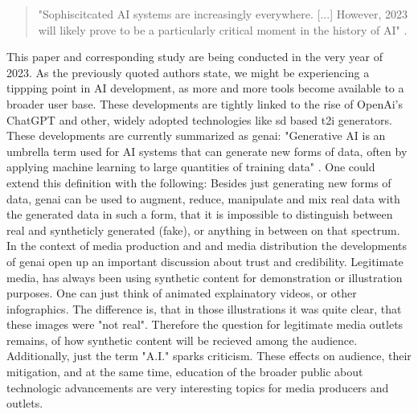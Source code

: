 \documentclass[
  a4paper,  %
  twoside,  %
  bibliography=totoc,
  headsepline,
  cleardoublepage=empty,
  parskip=half,
  draft=false
]{scrbook}
\begin{document}
\begin{quotation}
"Sophiscitcated AI systems are increasingly everywhere. [...] However, 2023 will likely prove to be a particularly critical moment in the history of AI" \citet{arguedasAutomatingDemocracyGenerative2023}.
\end{quotation}
This paper and corresponding study are being conducted in the very year of 2023. As the previously quoted authors state, we might be experiencing a tippping point in AI development, as more and more tools become available to a broader user base. These developments are tightly linked to the rise of OpenAi's ChatGPT and other, widely adopted technologies like \gls{sd} based \gls{t2i} generators. These developments are currently summarized as \gls{genai}: "Generative AI is an umbrella term used for AI systems that can generate new forms of data, often by applying machine learning to large quantities of training data" \citet{arguedasAutomatingDemocracyGenerative2023}. One could extend this definition with the following: Besides just generating new forms of data, \gls{genai} can be used to augment, reduce, manipulate and mix real data with the generated data in such a form, that it is impossible to distinguish between real and syntheticly generated (fake), or anything in between on that spectrum.
In the context of media production and and media distribution the developments of \gls{genai} open up an important discussion about trust and credibility. Legitimate media, has always been using synthetic content for demonstration or illustration purposes. One can just think of animated explainatory videos, or other infographics. The difference is, that in those illustrations it was quite clear, that these images were "not real". Therefore the question for legitimate media outlets remains, of how synthetic content will be recieved among the audience. Additionally, just the term "A.I." sparks criticism. These effects on audience, their mitigation, and at the same time, education of the broader public about technologic advancements are very interesting topics for media producers and outlets. \\
\end{document}
